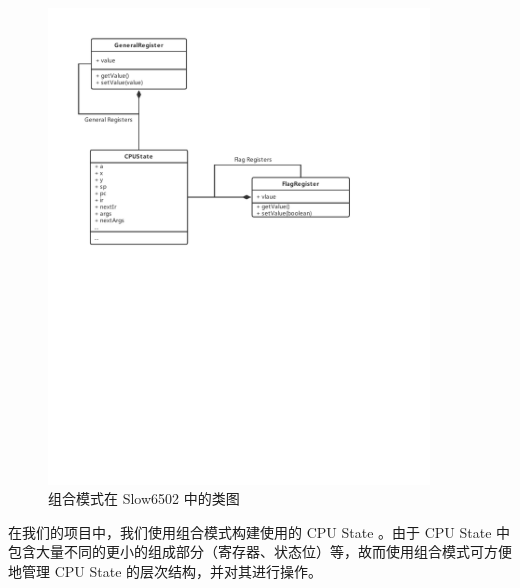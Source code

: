 \begin{figure}[H]
    \centering
    \includegraphics[width=0.9\textwidth]{figures/Composite.pdf}
    \caption{组合模式在 Slow6502 中的类图}
\end{figure}

在我们的项目中，我们使用组合模式构建使用的 CPU State 。由于 CPU State 中包含大量不同的更小的组成部分（寄存器、状态位）等，故而使用组合模式可方便地管理 CPU State 的层次结构，并对其进行操作。

